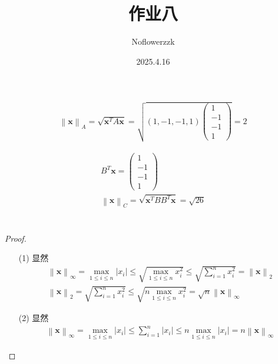 \documentclass{article}
\title{作业八}
\author{Noflowerzzk}
\date{2025.4.16}
\begin{document}
\maketitle

\section{}

\begin{align*}
    \left\lVert \boldsymbol{x}\right\rVert_A = \sqrt{\boldsymbol{x}^TA\boldsymbol{x}} = \sqrt{(1, -1, -1, 1)\begin{pmatrix}
        1 \\ -1 \\ -1 \\ 1
    \end{pmatrix}} = 2
\end{align*}

\begin{align*}
    B^T\boldsymbol{x} = \begin{pmatrix}1\\-1\\-1\\1\end{pmatrix} \\
    \left\lVert \boldsymbol{x}\right\rVert_C = \sqrt{\boldsymbol{x}^TBB^T\boldsymbol{x}} = \sqrt{26}
\end{align*}

\section{}

\begin{proof}
    \begin{itemize}
        \item [(1)] 显然 
        \begin{align*}
            \left\lVert \boldsymbol{x}\right\rVert_\infty = \max_{1 \leq i \leq n} \left\lvert x_i\right\rvert  \leq \sqrt{\max_{1 \leq i \leq n} x_i^2} \leq \sqrt{\sum_{i = 1}^{n}x_i^2} = \left\lVert \boldsymbol{x}\right\rVert_2 \\
            \left\lVert \boldsymbol{x}\right\rVert_2 = \sqrt{\sum_{i = 1}^{n}x_i^2} \leq \sqrt{n\max_{1 \leq i \leq n} x_i^2} = \sqrt{n}\left\lVert \boldsymbol{x}\right\rVert_\infty
        \end{align*}
        \item [(2)] 显然
        \begin{align*}
            \left\lVert \boldsymbol{x}\right\rVert_\infty = \max_{1 \leq i \leq n} \left\lvert x_i\right\rvert \leq \sum_{i = 1}^{n}\left\lvert x_i\right\rvert \leq n \max_{1 \leq i \leq n} \left\lvert x_i\right\rvert = n \left\lVert \boldsymbol{x}\right\rVert_\infty
        \end{align*}
    \end{itemize}
\end{proof}
\end{document}
